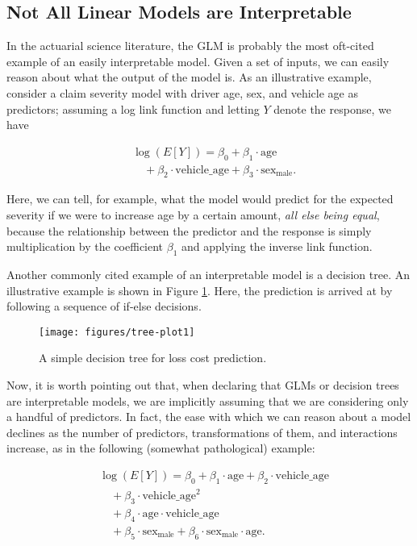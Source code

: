 \documentclass[preprint, 3p, twocolumn, letterpaper, 10pt]{elsarticle} %
\begin{document}
\hypertarget{linear-models}{%
\subsection{Not All Linear Models are Interpretable}\label{linear-models}}

In the actuarial science literature, the GLM is probably the most oft-cited
example of an easily interpretable model. Given a set of inputs, we can easily
reason about what the output of the model is. As an illustrative example,
consider a claim severity model with driver age, sex, and vehicle age as
predictors; assuming a log link function and letting \(Y\) denote the response, we
have

\begin{align}
& \log(E[Y]) = \beta_0 + \beta_1 \cdot \text{age} \nonumber \\
& \quad + \beta_2 \cdot \text{vehicle\_age} + \beta_3 \cdot \text{sex}_{\text{male}}.
\end{align}

Here, we can tell, for example, what the model would predict for the expected
severity if we were to increase age by a certain amount, \emph{all else being equal},
because the relationship between the predictor and the response is simply
multiplication by the coefficient \(\beta_1\) and applying the inverse link
function.

Another commonly cited example of an interpretable model is a decision tree. An
illustrative example is shown in Figure \ref{fig:tree-plot1}. Here, the
prediction is arrived at by following a sequence of if-else decisions.

\begin{figure}

{\centering \texttt{[image: figures/tree-plot1]} 

}

\caption{A simple decision tree for loss cost prediction.}\label{fig:tree-plot1}
\end{figure}

Now, it is worth pointing out that, when declaring that GLMs or decision trees
are interpretable models, we are implicitly assuming that we are considering
only a handful of predictors. In fact, the ease with which we can reason about a
model declines as the number of predictors, transformations of them, and
interactions increase, as in the following (somewhat pathological) example:

\begin{align}\label{eq:badglm}
& \log(E[Y]) = \beta_0 + \beta_1 \cdot \text{age} + \beta_2 \cdot \text{vehicle\_age} \nonumber\\
& \quad + \beta_3\cdot\text{vehicle\_age}^2 \nonumber \\
& \quad + \beta_4 \cdot \text{age} \cdot \text{vehicle\_age} \nonumber \\
& \quad + \beta_5 \cdot \text{sex}_{\text{male}} + \beta_6 \cdot \text{sex}_{\text{male}} \cdot \text{age}. 
\end{align}
\end{document}
